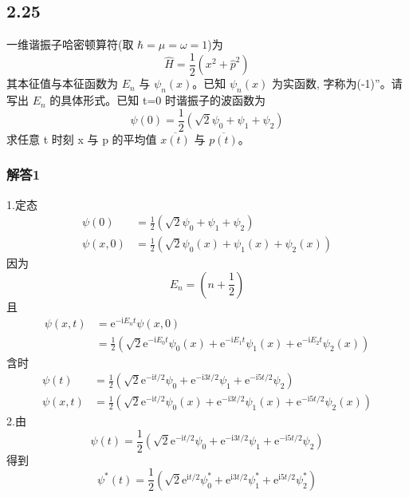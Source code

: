 \newpage
\subsection{2.25}
一维谐振子哈密顿算符(取 $\hbar = \mu = \omega = 1$)为
$$\hat{H} = \frac{1}{2}(x^2 + \hat{p}^2)$$
其本征值与本征函数为 $E_n$ 与 $\psi_n(x)$。已知 $\psi_n(x)$ 为实函数, 字称为(-1)”。请写出 $E_n$ 的具体形式。已知 t=0 时谐振子的波函数为
$$\psi(0) = \frac{1}{2} \left( \sqrt{2}\psi_0 + \psi_1 + \psi_2 \right)$$
求任意 t 时刻 x 与 p 的平均值 $\overline{x(t)}$ 与 $\overline{p(t)}$。

\subsubsection{解答1}

1.定态
\begin{equation}
    \begin{aligned}
        \psi (0)&=\frac{1}{2}\left( \sqrt{2}\psi _0+\psi _1+\psi _2 \right) 
\\
\psi (x,0)&=\frac{1}{2}\left( \sqrt{2}\psi _0(x)+\psi _1(x)+\psi _2(x) \right) 
    \end{aligned}
\end{equation}
因为
\begin{equation}
    E_n=\left( n+\frac{1}{2} \right) 
\end{equation}
且
\begin{equation}
    \begin{aligned}
        \psi (x,t)&=\mathrm{e}^{-\mathrm{i}E_nt}\psi (x,0)
\\
&=\frac{1}{2}\left( \sqrt{2}\mathrm{e}^{-\mathrm{i}E_0t}\psi _0(x)+\mathrm{e}^{-\mathrm{i}E_1t}\psi _1(x)+\mathrm{e}^{-\mathrm{i}E_2t}\psi _2(x) \right) 
    \end{aligned}
\end{equation}
含时
\begin{equation}
    \begin{aligned}
        \psi (t)&=\frac{1}{2}\left( \sqrt{2}\mathrm{e}^{-\mathrm{i}t/2}\psi _0+\mathrm{e}^{-\mathrm{i}3t/2}\psi _1+\mathrm{e}^{-\mathrm{i}5t/2}\psi _2 \right) 
\\
\psi (x,t)&=\frac{1}{2}\left( \sqrt{2}\mathrm{e}^{-\mathrm{i}t/2}\psi _0(x)+\mathrm{e}^{-\mathrm{i}3t/2}\psi _1(x)+\mathrm{e}^{-\mathrm{i}5t/2}\psi _2(x) \right) 
    \end{aligned}
\end{equation}
2.由
\begin{equation}
    \psi (t)=\frac{1}{2}\left( \sqrt{2}\mathrm{e}^{-\mathrm{i}t/2}\psi _0+\mathrm{e}^{-\mathrm{i}3t/2}\psi _1+\mathrm{e}^{-\mathrm{i}5t/2}\psi _2 \right) 
\end{equation}
得到
\begin{equation}
    \psi ^*(t)=\frac{1}{2}\left( \sqrt{2}\mathrm{e}^{\mathrm{i}t/2}\psi _{0}^{*}+\mathrm{e}^{\mathrm{i}3t/2}\psi _{1}^{*}+\mathrm{e}^{\mathrm{i}5t/2}\psi _{2}^{*} \right) 
\end{equation}

